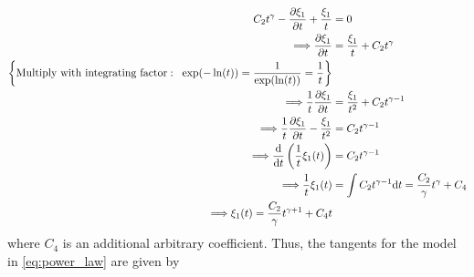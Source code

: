 \begin{align*}
  C_2t^\gamma-\pdv{\xi_1}{t}+\frac{\xi_1 }{t}&=0\\
  \Longrightarrow \pdv{\xi_1}{t}&=\frac{\xi_1 }{t}+C_2t^\gamma\\
  \left\{\textrm{Multiply with integrating factor}:\;\;\exp(-\ln(t))=\dfrac{1}{\exp(\ln(t))}=\dfrac{1}{t}\right\}&\\
  \Longrightarrow \dfrac{1}{t}\pdv{\xi_1}{t}&=\frac{\xi_1 }{t^2}+C_2t^{\gamma-1}\\
  \Longrightarrow \dfrac{1}{t}\pdv{\xi_1}{t}-\frac{\xi_1 }{t^2}&=C_2t^{\gamma-1}\\
  \Longrightarrow \dv{}{t}\left(\dfrac{1}{t}\xi_1(t)\right)&=C_2t^{\gamma-1}\\
  \Longrightarrow \dfrac{1}{t}\xi_1(t)&=\int C_2t^{\gamma-1}\dd t=\dfrac{C_2}{\gamma}t^\gamma+C_4\\
  \Longrightarrow \xi_1(t)=\dfrac{C_2}{\gamma}t^{\gamma+1}+C_4t
\end{align*}
where $C_4$ is an additional arbitrary coefficient. Thus, the tangents for the model in \eqref{eq:power_law} are given by

